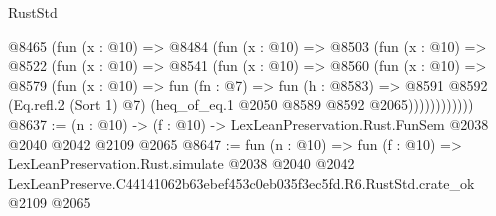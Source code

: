 \begin{lexlean}{RustStd}
\begin{coremodule}
          @8465
            (fun (x : @10) =>
            @8484
              (fun (x : @10) =>
              @8503
                (fun (x : @10) =>
                @8522
                  (fun (x : @10) =>
                  @8541
                    (fun (x : @10) =>
                    @8560
                      (fun (x : @10) =>
                      @8579
                        (fun (x : @10) =>
                        fun (fn : @7) =>
                        fun (h : @8583) =>
                        @8591
                          @8592
                          (Eq.refl.{2} (Sort 1) @7)
                          (heq_of_eq.{1} @2050 @8589 @8592 @2065))))))))))))
@8637 := (n : @10) -> (f : @10) -> LexLeanPreservation.Rust.FunSem @2038 @2040 @2042 @2109 @2065
@8647 := fun (n : @10) =>
  fun (f : @10) =>
  LexLeanPreservation.Rust.simulate
    @2038
    @2040
    @2042
    LexLeanPreserve.C44141062b63ebef453c0eb035f3ec5fd.R6.RustStd.crate_ok
    @2109
    @2065
\end{coremodule}
\end{lexlean}
